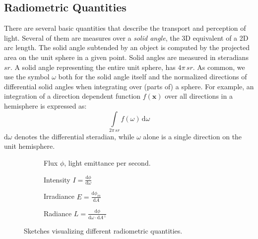 \documentclass[thesis.tex]{subfiles}
\begin{document}
\subsection{Radiometric Quantities}
There are several basic quantities that describe the transport and perception of light.
Several of them are measures over a \emph{solid angle}, the 3D equivalent of a 2D arc length.
The solid angle subtended by an object is computed by the projected area on the unit sphere in a given point.
Solid angles are measured in steradians $sr$.
A solid angle representing the entire unit sphere, has $4\pi\,sr$.
As common, we use the symbol $\omega$ both for the solid angle itself and the normalized directions of differential solid angles when integrating over (parts of) a sphere.
For example, an integration of a direction dependent function $f(\mathbf{x})$ over all directions in a hemisphere is expressed as:
\begin{equation}
\int\limits_{2\pi\,sr} f(\omega) \, \mathrm{d}\omega
\end{equation} 
$\mathrm{d}\omega$ denotes the differential steradian, while $\omega$ alone is a single direction on the unit hemisphere.

\begin{figure}[h]
\centering
\begin{subfigure}[b]{0.45\textwidth}
\centering
{}
\caption{Flux $\phi$, light emittance per second.}
\label{fig:flux}
\end{subfigure}
\begin{subfigure}[b]{0.45\textwidth}
\centering
{}
\caption{Intensity $I = \frac{\mathrm{d}\phi}{\mathrm{d}\omega}$}
\label{fig:intensity}
\end{subfigure}

\vspace{10pt}

\begin{subfigure}[b]{0.45\textwidth}
\centering
{}
\caption{Irradiance $E = \frac{\mathrm{d}\phi_{in}}{\mathrm{d}A}$}
\label{fig:irradiance}
\end{subfigure}
\begin{subfigure}[b]{0.45\textwidth}
\centering
{}
\caption{Radiance $L = \frac{\mathrm{d}\phi}{\mathrm{d}\omega \cdot \mathrm{d}A^\perp }$}
\label{fig:radiance}
\end{subfigure}
\caption{Sketches visualizing different radiometric quantities.}
\end{figure}
\end{document}
